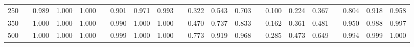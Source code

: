 % 
\begin{tabular}{ccccccccccccccccccccc}
  \hline
  \hline
250 &  & 0.989 & 1.000 & 1.000 &  & 0.901 & 0.971 & 0.993 &  & 0.322 & 0.543 & 0.703 &  & 0.100 & 0.224 & 0.367 &  & 0.804 & 0.918 & 0.958 \\ 
  350 &  & 1.000 & 1.000 & 1.000 &  & 0.990 & 1.000 & 1.000 &  & 0.470 & 0.737 & 0.833 &  & 0.162 & 0.361 & 0.481 &  & 0.950 & 0.988 & 0.997 \\ 
  500 &  & 1.000 & 1.000 & 1.000 &  & 0.999 & 1.000 & 1.000 &  & 0.773 & 0.919 & 0.968 &  & 0.285 & 0.473 & 0.649 &  & 0.994 & 0.999 & 1.000 \\ 
   \hline
\end{tabular}
